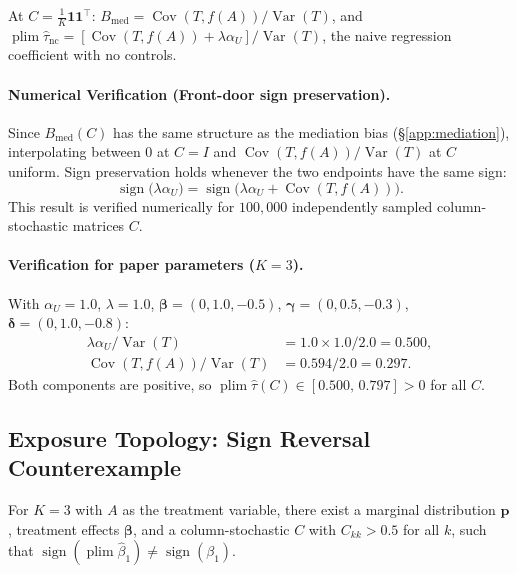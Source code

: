 At $C=\frac{1}{K}\mathbf{1}\mathbf{1}^\top$: $B_{\mathrm{med}}=\operatorname{Cov}(T,f(A))/\operatorname{Var}(T)$, and $\operatorname{plim}\hat\tau_{\mathrm{nc}}=[\operatorname{Cov}(T,f(A))+\lambda\alpha_U]/\operatorname{Var}(T)$, the naive regression coefficient with no controls.

\paragraph{Numerical Verification (Front-door sign preservation).}
\label{find:fd_sign}
Since $B_{\mathrm{med}}(C)$ has the same structure as the mediation bias (§\ref{app:mediation}), interpolating between $0$ at $C{=}I$ and $\operatorname{Cov}(T,f(A))/\operatorname{Var}(T)$ at $C$ uniform. Sign preservation holds whenever the two endpoints have the same sign:
\[
  \operatorname{sign}\!\bigl(\lambda\alpha_U\bigr)
  = \operatorname{sign}\!\bigl(\lambda\alpha_U + \operatorname{Cov}(T,f(A))\bigr).
\]
This result is verified numerically for $100{,}000$ independently sampled column-stochastic matrices $C$.

\paragraph{Verification for paper parameters ($K{=}3$).}
With $\alpha_U{=}1.0$, $\lambda{=}1.0$, $\boldsymbol{\beta}{=}(0,1.0,{-}0.5)$, $\boldsymbol{\gamma}{=}(0,0.5,{-}0.3)$, $\boldsymbol{\delta}{=}(0,1.0,{-}0.8)$:
\begin{align*}
  \lambda\alpha_U/\operatorname{Var}(T) &= 1.0\!\times\!1.0/2.0 = 0.500,\\
  \operatorname{Cov}(T,\!f(A))/\operatorname{Var}(T) &= 0.594/2.0 = 0.297.
\end{align*}
Both components are positive, so $\operatorname{plim}\hat\tau(C)\in[0.500,\,0.797]>0$ for all $C$.

\subsection{Exposure Topology: Sign Reversal Counterexample}
\label{app:exposure}

\begin{proposition}
\label{prop:exp_counter}
For $K{=}3$ with $A$ as the treatment variable, there exist a marginal distribution $\mathbf{p}$, treatment effects $\boldsymbol{\beta}$, and a column-stochastic $C$ with $C_{kk}>0.5$ for all $k$, such that $\operatorname{sign}(\operatorname{plim}\hat\beta_1)\neq\operatorname{sign}(\beta_1)$.
\end{proposition}

